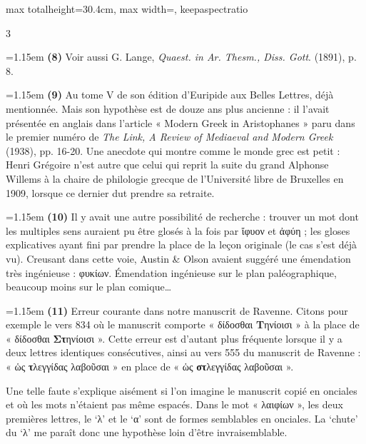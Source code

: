 \documentclass[11pt,twoside]{book}
\newcommand{\italique}[1]{\textit{#1}}
\begin{document}
\begin{adjustbox}{max totalheight=30.4cm, max width=\textwidth, keepaspectratio}
\begin{minipage}{\textwidth}
{\begin{multicols}{3}
\par\vspace{1.5pt}
\noindent\hangindent=1.15em {\color{sepiaNote}\textbf{(8)}} Voir aussi G. Lange, \italique{Quaest. in Ar. Thesm., Diss. Gott}. (1891), p. 8.
\par\vspace{1.5pt}
\noindent\hangindent=1.15em {\color{sepiaNote}\textbf{(9)}} Au tome V de son édition d'Euripide aux Belles Lettres, déjà mentionnée. Mais son hypothèse est de douze ans plus ancienne : il l'avait présentée en anglais dans l'article « Modern Greek in Aristophanes » paru dans le premier numéro de \italique{The Link, A Review of Mediaeval and Modern Greek} (1938), pp. 16-20. Une anecdote qui montre comme le monde grec est petit : Henri Grégoire n'est autre que celui qui reprit la suite du grand Alphonse Willems à la chaire de philologie grecque de l'Université libre de Bruxelles en 1909, lorsque ce dernier dut prendre sa retraite.
\par\vspace{1.5pt}
\noindent\hangindent=1.15em {\color{sepiaNote}\textbf{(10)}} Il y avait une autre possibilité de recherche : trouver un mot dont les multiples sens auraient pu être glosés à la fois par ἴφυον et ἀφύη ; les gloses explicatives ayant fini par prendre la place de la leçon originale (le cas s'est déjà vu). Creusant dans cette voie, Austin \& Olson avaient suggéré une émendation très ingénieuse : φυκίων. Émendation ingénieuse sur le plan paléographique, beaucoup moins sur le plan comique…
\par\vspace{1.5pt}
\noindent\hangindent=1.15em {\color{sepiaNote}\textbf{(11)}} Erreur courante dans notre manuscrit de Ravenne. Citons pour exemple le vers 834 où le manuscrit comporte « δίδοσθαι \textbf{Τ}ηνίοισι » à la place de « δίδοσθαι \textbf{Στ}ηνίοισι ». Cette erreur est d'autant plus fréquente lorsque il y a deux lettres identiques consécutives, ainsi au vers 555 du manuscrit de Ravenne : « ὡς \textbf{τ}λεγγίδας λαβοῦσαι » en place de « ὡς \textbf{στ}λεγγίδας λαβοῦσαι ».
\par\vspace{1.5pt}
\noindent Une telle faute s'explique aisément si l'on imagine le manuscrit copié en onciales et où les mots n'étaient pas même espacés. Dans le mot « λαιφίων », les deux premières lettres, le `λ' et le `α' sont de formes semblables en onciales. La `chute' du `λ' me paraît donc une hypothèse loin d'être invraisemblable.
\par\vspace{1.5pt}

\end{multicols}}
\end{minipage}
\end{adjustbox}
\end{document}
